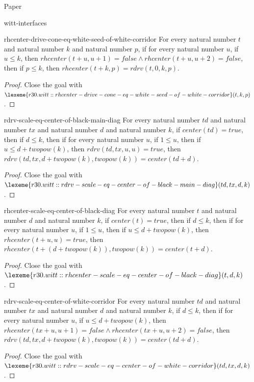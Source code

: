 \begin{lexlean}{Paper}
\begin{section}{witt-interfaces}
  \begin{theorem}{rhcenter-drive-cone-eq-white-seed-of-white-corridor}
  For every natural number \(t\) and natural number \(k\) and natural number \(p\), if for every natural number \(u\), if \(u ≤ k\), then \(rhcenter(t + u, u + 1) = false ∧ rhcenter(t + u, u + 2) = false\), then if \(p ≤ k\), then \(rhcenter(t + k, p) = rdrv(t, 0, k, p)\).
  \begin{proof}
  Close the goal with \(\lexeme{r30.witt::rhcenter-drive-cone-eq-white-seed-of-white-corridor}(t, k, p)\).
  \end{proof}
  \end{theorem}

  \begin{theorem}{rdrv-scale-eq-center-of-black-main-diag}
  For every natural number \(td\) and natural number \(tx\) and natural number \(d\) and natural number \(k\), if \(center(td) = true\), then if \(d ≤ k\), then if for every natural number \(u\), if \(1 ≤ u\), then if \(u ≤ d + twopow(k)\), then \(rdrv(td, tx, u, u) = true\), then \(rdrv(td, tx, d + twopow(k), twopow(k)) = center(td + d)\).
  \begin{proof}
  Close the goal with \(\lexeme{r30.witt::rdrv-scale-eq-center-of-black-main-diag}(td, tx, d, k)\).
  \end{proof}
  \end{theorem}

  \begin{theorem}{rhcenter-scale-eq-center-of-black-diag}
  For every natural number \(t\) and natural number \(d\) and natural number \(k\), if \(center(t) = true\), then if \(d ≤ k\), then if for every natural number \(u\), if \(1 ≤ u\), then if \(u ≤ d + twopow(k)\), then \(rhcenter(t + u, u) = true\), then \(rhcenter(t + (d + twopow(k)), twopow(k)) = center(t + d)\).
  \begin{proof}
  Close the goal with \(\lexeme{r30.witt::rhcenter-scale-eq-center-of-black-diag}(t, d, k)\).
  \end{proof}
  \end{theorem}

  \begin{theorem}{rdrv-scale-eq-center-of-white-corridor}
  For every natural number \(td\) and natural number \(tx\) and natural number \(d\) and natural number \(k\), if \(d ≤ k\), then if for every natural number \(u\), if \(u ≤ d + twopow(k)\), then \(rhcenter(tx + u, u + 1) = false ∧ rhcenter(tx + u, u + 2) = false\), then \(rdrv(td, tx, d + twopow(k), twopow(k)) = center(td + d)\).
  \begin{proof}
  Close the goal with \(\lexeme{r30.witt::rdrv-scale-eq-center-of-white-corridor}(td, tx, d, k)\).
  \end{proof}
  \end{theorem}


\end{section}
\end{lexlean}
